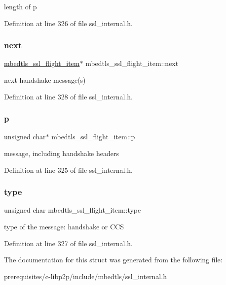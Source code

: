 length of p 

Definition at line 326 of file ssl\+\_\+internal.\+h.

\mbox{\label{structmbedtls__ssl__flight__item_a10b26523d65d985a745e517312ca4ca1}} 
\subsubsection{\texorpdfstring{next}{next}}
{\footnotesize\ttfamily \mbox{\hyperlink{structmbedtls__ssl__flight__item}{mbedtls\+\_\+ssl\+\_\+flight\+\_\+item}}$\ast$ mbedtls\+\_\+ssl\+\_\+flight\+\_\+item\+::next}

next handshake message(s) 

Definition at line 328 of file ssl\+\_\+internal.\+h.

\mbox{\label{structmbedtls__ssl__flight__item_aad7b11522ddc6f7ea383231b9e3cedf1}} 
\subsubsection{\texorpdfstring{p}{p}}
{\footnotesize\ttfamily unsigned char$\ast$ mbedtls\+\_\+ssl\+\_\+flight\+\_\+item\+::p}

message, including handshake headers 

Definition at line 325 of file ssl\+\_\+internal.\+h.

\mbox{\label{structmbedtls__ssl__flight__item_acdfcb3e1d7848e7f09d9c00defa90e4b}} 
\subsubsection{\texorpdfstring{type}{type}}
{\footnotesize\ttfamily unsigned char mbedtls\+\_\+ssl\+\_\+flight\+\_\+item\+::type}

type of the message\+: handshake or C\+CS 

Definition at line 327 of file ssl\+\_\+internal.\+h.



The documentation for this struct was generated from the following file\+:\begin{DoxyCompactItemize}
\item 
prerequisites/c-\/libp2p/include/mbedtls/ssl\+\_\+internal.\+h\end{DoxyCompactItemize}
